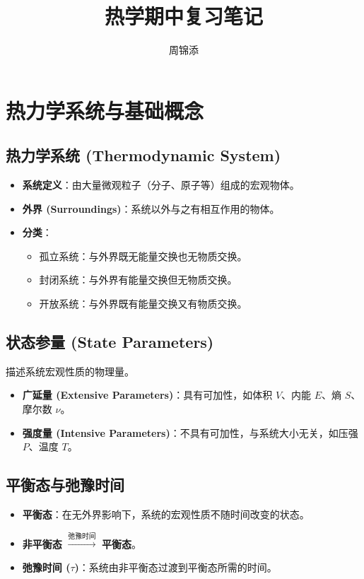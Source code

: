 \documentclass{article}
\title{热学期中复习笔记}
\date{}
\author{周锦添}
\begin{document}
\maketitle

\tableofcontents
\newpage

\section{热力学系统与基础概念}

\subsection{热力学系统 (Thermodynamic System)}
\begin{itemize}
    \item \textbf{系统定义}：由大量微观粒子（分子、原子等）组成的宏观物体。
    \item \textbf{外界 (Surroundings)}：系统以外与之有相互作用的物体。
    \item \textbf{分类}：
    \begin{itemize}
        \item 孤立系统：与外界既无能量交换也无物质交换。
        \item 封闭系统：与外界有能量交换但无物质交换。
        \item 开放系统：与外界既有能量交换又有物质交换。
    \end{itemize}
\end{itemize}

\subsection{状态参量 (State Parameters)}
描述系统宏观性质的物理量。
\begin{itemize}
    \item \textbf{广延量 (Extensive Parameters)}：具有可加性，如体积 $V$、内能 $E$、熵 $S$、摩尔数 $\nu$。
    \item \textbf{强度量 (Intensive Parameters)}：不具有可加性，与系统大小无关，如压强 $P$、温度 $T$。
\end{itemize}

\subsection{平衡态与弛豫时间}
\begin{itemize}
    \item \textbf{平衡态}：在无外界影响下，系统的宏观性质不随时间改变的状态。
    \item \textbf{非平衡态} $\xrightarrow{\text{弛豫时间}}$ \textbf{平衡态}。
    \item \textbf{弛豫时间 ($\tau$)}：系统由非平衡态过渡到平衡态所需的时间。
\end{itemize}
\end{document}
